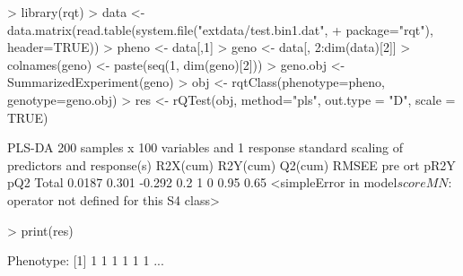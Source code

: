 \documentclass{article}
\begin{document}
\begin{Schunk}
\begin{Sinput}
> library(rqt)
> data <- data.matrix(read.table(system.file("extdata/test.bin1.dat",
+                                            package="rqt"), header=TRUE))
> pheno <- data[,1]
> geno <- data[, 2:dim(data)[2]]
> colnames(geno) <- paste(seq(1, dim(geno)[2]))
> geno.obj <- SummarizedExperiment(geno)
> obj <- rqtClass(phenotype=pheno, genotype=geno.obj)
> res <- rQTest(obj, method="pls", out.type = "D", scale = TRUE)
\end{Sinput}
\begin{Soutput}
PLS-DA
200 samples x 100 variables and 1 response
standard scaling of predictors and response(s)
      R2X(cum) R2Y(cum) Q2(cum) RMSEE pre ort pR2Y  pQ2
Total   0.0187    0.301  -0.292   0.2   1   0 0.95 0.65
<simpleError in model$scoreMN: $ operator not defined for this S4 class>
\end{Soutput}
\begin{Sinput}
> print(res)
\end{Sinput}
\begin{Soutput}
Phenotype:
[1] 1 1 1 1 1 1
...


\end{Soutput}
\end{Schunk}
\end{document}
